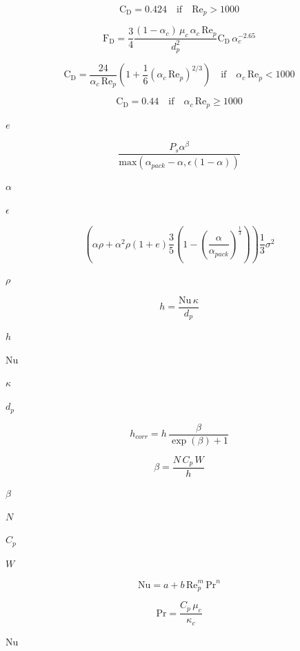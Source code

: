 \documentclass{article}
\begin{document}
\[
    \mathrm{C}_\mathrm{D} =
        0.424 \quad \mathrm{if} \quad \mathrm{Re}_p > 1000
\]
\pagebreak

\[
    \mathrm{F}_\mathrm{D} =
        \frac{3}{4}
        \frac{(1 - \alpha_c) \, \mu_c \, \alpha_c \, \mathrm{Re}_p }{d_p^2}
        \mathrm{C}_\mathrm{D} \, \alpha_c^{-2.65}
\]
\pagebreak

\[
    \mathrm{C}_\mathrm{D} =
        \frac{24}{\alpha_c \, \mathrm{Re}_p}
        \left(1 + \frac{1}{6}(\alpha_c \, \mathrm{Re}_p)^{2/3} \right)
        \quad \mathrm{if} \quad \alpha_c \, \mathrm{Re}_p < 1000
\]
\pagebreak

\[
    \mathrm{C}_\mathrm{D} =
        0.44 \quad \mathrm{if} \quad \alpha_c \, \mathrm{Re}_p \geq 1000
\]
\pagebreak

$e$
\pagebreak

\[
    \frac{P_s \alpha^\beta}{ \mathrm{max} \left( \alpha_{pack} - \alpha ,
    \epsilon ( 1 - \alpha ) \right) }
\]
\pagebreak

$\alpha$
\pagebreak

$\epsilon$
\pagebreak

\[
    \left( \alpha \rho + \alpha^2 \rho (1 + e) \frac{3}{5}
    \left( 1 - \left( \frac{\alpha}{\alpha_{pack}} \right)^\frac{1}{3}
    \right) \right) \frac{1}{3} \sigma^2
\]
\pagebreak

$\rho$
\pagebreak

\[
    h = \frac{\mathrm{Nu} \, \kappa}{d_p}
\]
\pagebreak

$        h            $
\pagebreak

$        \mathrm{Nu}  $
\pagebreak

$        \kappa       $
\pagebreak

$        d_p          $
\pagebreak

\[
        h_{corr} = h \, \frac{\beta}{ \exp(\beta) + 1 }
    \]
\pagebreak

\[
        \beta = \frac{N \, C_p \, W}{h}
    \]
\pagebreak

$        \beta   $
\pagebreak

$        N       $
\pagebreak

$        C_p     $
\pagebreak

$        W       $
\pagebreak

\[
    \mathrm{Nu} = a + b \, \mathrm{Re}_p^{m} \, \mathrm{Pr}^{n}
\]
\pagebreak

\[
    \mathrm{Pr} = \frac{ C_p \, \mu_c }{ \kappa_c }
\]
\pagebreak

$        \mathrm{Nu}    $
\pagebreak
\end{document}

